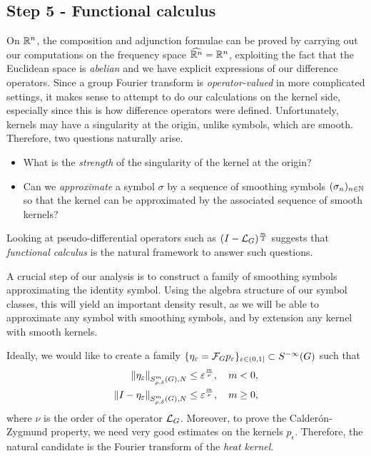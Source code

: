 \subsection*{Step 5 - Functional calculus}

On $\mathbb{R}^n$,
the composition and adjunction formulae can be proved by carrying out our computations on the frequency space ${\widehat{\mathbb{R}^n}} = \mathbb{R}^n$,
exploiting the fact that the Euclidean space is \emph{abelian} and we have explicit expressions of our difference operators.
Since a group Fourier transform is \emph{operator-valued} in more complicated settings,
it makes sense to attempt to do our calculations on the kernel side,
especially since this is how difference operators were defined.
Unfortunately,
kernels may have a singularity at the origin,
unlike symbols, which are smooth.
Therefore, two questions naturally arise.

\begin{itemize}
    \item What is the \emph{strength} of the singularity of the kernel at the origin?
    \item Can we \emph{approximate} a symbol $\sigma$ by a sequence of smoothing symbols $(\sigma_n)_{n \in \mathbb{N}}$ so that the kernel can be approximated by the associated sequence of smooth kernels?
\end{itemize}

Looking at pseudo-differential operators such as $(I - {\mathcal{L}_{G}})^\frac{m}{2}$
suggests that \emph{functional calculus} is the natural framework to answer such questions.

A crucial step of our analysis is to construct a family of smoothing symbols approximating the identity symbol.
Using the algebra structure of our symbol classes,
this will yield an important density result,
as we will be able to approximate any symbol with smoothing symbols,
and by extension any kernel with smooth kernels.

Ideally,
we would like to create a family $\{\eta_\varepsilon = \mathcal{F}_{G} p_\varepsilon\}_{\varepsilon \in (0, 1]} \subset {S^{-\infty} (G)}$
such that
\begin{align}
    \SymbolSemiNorm m {\rho, \delta} N {\eta_\epsilon}
    &\leq \epsilon^\frac m \nu,
    \quad m < 0,
    \label{eq:survey:density_estimate:1}
    \\
    \SymbolSemiNorm m {\rho, \delta} N {\Id {} - \eta_\epsilon}
    &\leq \epsilon^\frac m \nu,
    \quad m \geq 0,
    \label{eq:survey:density_estimate:2}
\end{align}
where $\nu$ is the order of the operator ${\mathcal{L}_{G}}$.
Moreover,
to prove the Calder\'on-Zygmund property,
we need very good estimates on the kernels $p_\epsilon$.
Therefore, the natural candidate is the Fourier transform of the \emph{heat kernel}.

